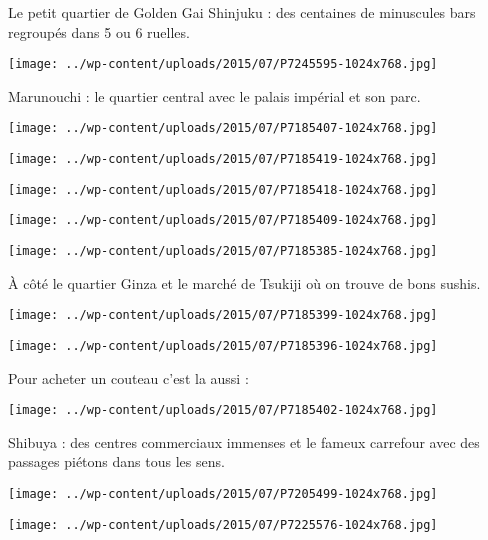  Le petit quartier de Golden Gai Shinjuku : des centaines de minuscules bars regroupés dans 5 ou 6 ruelles. 
\begin{center} \texttt{[image: ../wp-content/uploads/2015/07/P7245595-1024x768.jpg]} \end{center}

\pagebreak
 Marunouchi : le quartier central avec le palais impérial et son parc. 
\begin{center} \texttt{[image: ../wp-content/uploads/2015/07/P7185407-1024x768.jpg]} \end{center}
\begin{center} \texttt{[image: ../wp-content/uploads/2015/07/P7185419-1024x768.jpg]} \end{center}
\begin{center} \texttt{[image: ../wp-content/uploads/2015/07/P7185418-1024x768.jpg]} \end{center}
\begin{center} \texttt{[image: ../wp-content/uploads/2015/07/P7185409-1024x768.jpg]} \end{center}
\begin{center} \texttt{[image: ../wp-content/uploads/2015/07/P7185385-1024x768.jpg]} \end{center}

 \`A côté le quartier Ginza et le marché de Tsukiji où on trouve de bons sushis. 
\begin{center} \texttt{[image: ../wp-content/uploads/2015/07/P7185399-1024x768.jpg]} \end{center}
\begin{center} \texttt{[image: ../wp-content/uploads/2015/07/P7185396-1024x768.jpg]} \end{center}

 Pour acheter un couteau c'est la aussi :
\begin{center} \texttt{[image: ../wp-content/uploads/2015/07/P7185402-1024x768.jpg]} \end{center}

\pagebreak
 Shibuya : des centres commerciaux immenses et le fameux carrefour avec des passages piétons dans tous les sens. 
\begin{center} \texttt{[image: ../wp-content/uploads/2015/07/P7205499-1024x768.jpg]} \end{center}
\begin{center} \texttt{[image: ../wp-content/uploads/2015/07/P7225576-1024x768.jpg]} \end{center}

